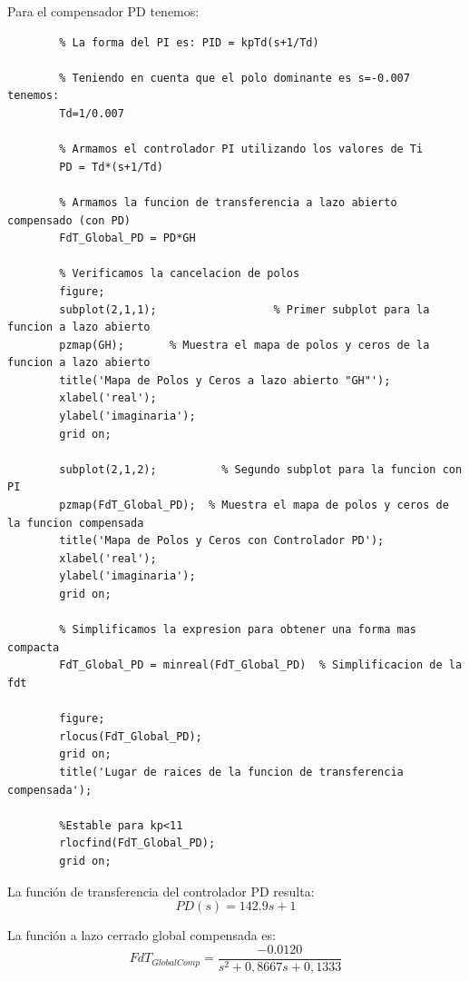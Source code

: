 \documentclass[12pt]{article}
\begin{document}
	Para el compensador PD tenemos:
	\begin{lstlisting}
		% La forma del PI es: PID = kpTd(s+1/Td)
		
		% Teniendo en cuenta que el polo dominante es s=-0.007 tenemos:
		Td=1/0.007
		
		% Armamos el controlador PI utilizando los valores de Ti
		PD = Td*(s+1/Td)
		
		% Armamos la funcion de transferencia a lazo abierto compensado (con PD)
		FdT_Global_PD = PD*GH
		
		% Verificamos la cancelacion de polos
		figure;
		subplot(2,1,1);                  % Primer subplot para la funcion a lazo abierto
		pzmap(GH);       % Muestra el mapa de polos y ceros de la funcion a lazo abierto
		title('Mapa de Polos y Ceros a lazo abierto "GH"');
		xlabel('real');
		ylabel('imaginaria');
		grid on;
		
		subplot(2,1,2);          % Segundo subplot para la funcion con PI
		pzmap(FdT_Global_PD);  % Muestra el mapa de polos y ceros de la funcion compensada
		title('Mapa de Polos y Ceros con Controlador PD');
		xlabel('real');
		ylabel('imaginaria');
		grid on;
		
		% Simplificamos la expresion para obtener una forma mas compacta
		FdT_Global_PD = minreal(FdT_Global_PD)  % Simplificacion de la fdt
		
		figure;
		rlocus(FdT_Global_PD);         
		grid on;                         
		title('Lugar de raices de la funcion de transferencia compensada');
		
		%Estable para kp<11
		rlocfind(FdT_Global_PD);
		grid on;
	\end{lstlisting}
	
	La función de transferencia del controlador PD resulta:
	\begin{equation}
		PD(s)=142.9s+1
	\end{equation}
	
	La función a lazo cerrado global compensada es:
	\begin{equation}
		FdT_{GlobalComp}=\frac{-0.0120}{s^2+0,8667s+0,1333}
	\end{equation}
	
\end{document}

